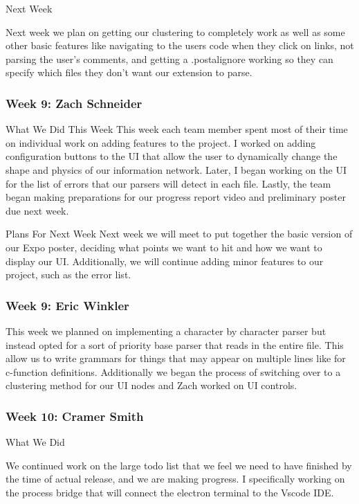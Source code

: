 Next Week

Next week we plan on getting our clustering to completely work as well as some other basic features like navigating to the users code when they click on links, not parsing the user's comments, and getting a .postalignore working so they can specify which files they don't want our extension to parse. 

\subsubsection{Week 9: Zach Schneider}

What We Did This Week
This week each team member spent most of their time on individual work on adding features to the project. I worked on adding configuration buttons to the UI that allow the user to dynamically change the shape and physics of our information network. Later, I began working on the UI for the list of errors that our parsers will detect in each file. Lastly, the team began making preparations for our progress report video and preliminary poster due next week.

Plans For Next Week
Next week we will meet to put together the basic version of our Expo poster, deciding what points we want to hit and how we want to display our UI. Additionally, we will continue adding minor features to our project, such as the error list.

\subsubsection{Week 9: Eric Winkler}

This week we planned on implementing a character by character parser but instead opted for a sort of priority base parser that reads in the entire file. This allow us to write grammars for things that may appear on multiple lines like for c-function definitions. Additionally we began the process of switching over to a clustering method for our UI nodes and Zach worked on UI controls.

\subsubsection{Week 10: Cramer Smith}

What We Did

We continued work on the large todo list that we feel we need to have finished by the time of actual release, and we are making progress. I specifically working on the process bridge that will connect the electron terminal to the Vscode IDE. 

